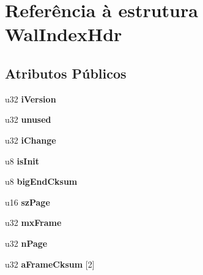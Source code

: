 \hypertarget{struct_wal_index_hdr}{\section{Referência à estrutura Wal\-Index\-Hdr}
\label{struct_wal_index_hdr}
}
\subsection*{Atributos Públicos}
\begin{DoxyCompactItemize}
\item 
\hypertarget{struct_wal_index_hdr_a49295f5eb9d6f37a1498cf1a66410b92}{u32 {\bfseries i\-Version}}\label{struct_wal_index_hdr_a49295f5eb9d6f37a1498cf1a66410b92}

\item 
\hypertarget{struct_wal_index_hdr_aa00596b4ad38dce7f97261a49ce64d74}{u32 {\bfseries unused}}\label{struct_wal_index_hdr_aa00596b4ad38dce7f97261a49ce64d74}

\item 
\hypertarget{struct_wal_index_hdr_a9fafc4d4af9ab741b3b8733380a7927f}{u32 {\bfseries i\-Change}}\label{struct_wal_index_hdr_a9fafc4d4af9ab741b3b8733380a7927f}

\item 
\hypertarget{struct_wal_index_hdr_a1cc0dc2be6cd108a7bcca260be3e4cb9}{u8 {\bfseries is\-Init}}\label{struct_wal_index_hdr_a1cc0dc2be6cd108a7bcca260be3e4cb9}

\item 
\hypertarget{struct_wal_index_hdr_aa6be53a6a60ea0b2a97a245b5ca68d61}{u8 {\bfseries big\-End\-Cksum}}\label{struct_wal_index_hdr_aa6be53a6a60ea0b2a97a245b5ca68d61}

\item 
\hypertarget{struct_wal_index_hdr_a74e9182803402942cf6e45d8e23589c7}{u16 {\bfseries sz\-Page}}\label{struct_wal_index_hdr_a74e9182803402942cf6e45d8e23589c7}

\item 
\hypertarget{struct_wal_index_hdr_aa697dbe8134daf3d02dce07feb897f41}{u32 {\bfseries mx\-Frame}}\label{struct_wal_index_hdr_aa697dbe8134daf3d02dce07feb897f41}

\item 
\hypertarget{struct_wal_index_hdr_ae4ca33947cd629feb9dce2b1f976c364}{u32 {\bfseries n\-Page}}\label{struct_wal_index_hdr_ae4ca33947cd629feb9dce2b1f976c364}

\item 
\hypertarget{struct_wal_index_hdr_a425dff294e0f0b30b6819c273404c721}{u32 {\bfseries a\-Frame\-Cksum} \mbox{[}2\mbox{]}}\label{struct_wal_index_hdr_a425dff294e0f0b30b6819c273404c721}


\end{DoxyCompactItemize}
